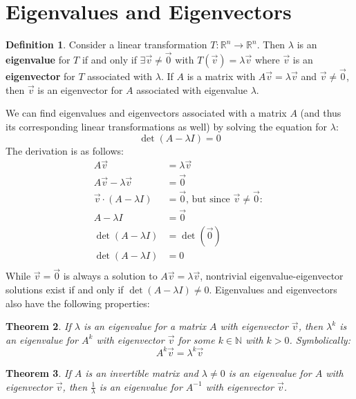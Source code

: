 \documentclass[11pt]{amsart}
\newtheorem{theorem}{Theorem}[section]
\theoremstyle{definition}
\newtheorem{definition}[theorem]{Definition}
\newcommand{\reals}{\mathbb{R}}
\newcommand{\naturals}{\mathbb{N}}
\begin{document}
\section{Eigenvalues and Eigenvectors}
\begin{definition}
	Consider a linear transformation $T: \reals^n \to \reals^n$. Then $\lambda$ is an \textbf{eigenvalue} for $T$ if and only if 
	$\exists \vec{v} \neq \vec{0}$ with $T(\vec{v}) = \lambda \vec{v}$ where $\vec{v}$ is an \textbf{eigenvector} for $T$ associated 
	with $\lambda$. If $A$ is a matrix with $A\vec{v} = \lambda\vec{v}$ and $\vec{v} \neq \vec{0}$, then $\vec{v}$ is an eigenvector for $A$
	associated with eigenvalue $\lambda$.
\end{definition}
We can find eigenvalues and eigenvectors associated with a matrix $A$ (and thus its corresponding linear transformations as well) by solving the
equation for $\lambda$:
\[
	\det(A - \lambda I) = 0
\]
The derivation is as follows:
\begin{align*}
	A\vec{v} &= \lambda \vec{v} \\
	A\vec{v} - \lambda \vec{v} &= \vec{0} \\
	\vec{v} \cdot (A - \lambda I) &= \vec{0} \text{, but since $\vec{v} \neq \vec{0}$: } \\
	A - \lambda I &= \vec{0} \\
	\det(A - \lambda I) &= \det(\vec{0}) \\
	\det(A - \lambda I) &= 0 \\
\end{align*}
While $\vec{v} = \vec{0}$ is always a solution to $A\vec{v} = \lambda \vec{v}$, nontrivial eigenvalue-eigenvector solutions exist if and only if
$\det(A - \lambda I) \neq 0$. Eigenvalues and eigenvectors also have the following properties:
\begin{theorem}
	If $\lambda$ is an eigenvalue for a matrix $A$ with eigenvector $\vec{v}$, then $\lambda^k$ is an eigenvalue for $A^k$ with eigenvector
	$\vec{v}$ for some $k \in \naturals$ with $k > 0$. Symbolically:
	\[
		A^k \vec{v} = \lambda^k \vec{v}
	\]
\end{theorem}
\begin{theorem}
	If $A$ is an invertible matrix and $\lambda \neq 0$ is an eigenvalue for $A$ with eigenvector $\vec{v}$, then $\frac{1}{\lambda}$ is an
	eigenvalue for $A^{-1}$ with eigenvector $\vec{v}$.
\end{theorem}
\end{document}
